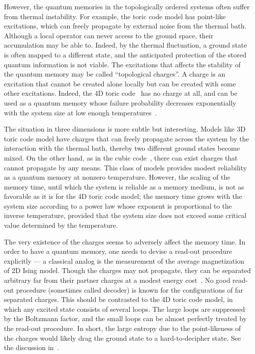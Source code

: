 \documentclass[letterpaper,12pt]{amsart}
\theoremstyle{definition} \newtheorem{defn}{Definition}
\theoremstyle{definition} \newtheorem{rem}{Remark}
\theoremstyle{definition} \newtheorem{example}{Example}
\begin{document}
However, the quantum memories in the topologically ordered systems
often suffer from thermal instability.
For example, the toric code model has point-like excitations,
which can freely propagate by external noise from the thermal bath.
Although a local operator can never access to the ground space,
their accumulation may be able to.
Indeed, by the thermal fluctuation, a ground state
is often mapped to a different state,
and the anticipated protection of the stored quantum information is not viable.
The excitations that affects the stability of the quantum memory
may be called ``topological charges''.
A charge is an excitation that cannot be created alone locally
but can be created with some other excitations.
Indeed, the 4D toric code~\cite{DennisKitaevLandahlEtAl2002Topological}
has no charge at all,
and can be used as a quantum memory whose failure probability
decreases exponentially with the system size at low enough 
temperatures~\cite{AlickiHorodeckiHorodeckiEtAl2010thermal,
ChesiLossBravyiEtAl2010Thermodynamic}.


The situation in three dimensions is more subtle but interesting.
Models like 3D toric code model have charges
that can freely propagate across the system by the interaction with the thermal bath,
thereby two different ground states become mixed.
On the other hand, as in the cubic code~\cite{Haah2011Local,BravyiHaah2011Energy,BravyiHaah2011Memory},
there can exist charges that cannot propagate by any means.
This class of models provides modest reliability as a quantum memory at nonzero temperature.
However, the scaling of the memory time, until which the system is reliable as a memory medium,
is not as favorable as it is for the 4D toric code model;
the memory time grows with the system size according to a power law
whose exponent is proportional to the inverse temperature,
provided that the system size does not exceed some critical value
determined by the temperature.


The very existence of the charges seems to adversely affect the memory time.
In order to have a quantum memory,
one needs to devise a read-out procedure explicitly ---
a classical analog is the measurement of the average magnetization of 2D Ising model.
Though the charges may not propagate,
they can be separated arbitrary far from their partner charges
at a modest energy cost~\cite{BravyiHaah2011Energy}.
No good read-out procedure (sometimes called decoder)
is known for the configurations of far separated charges.
This should be contrasted to the 4D toric code model,
in which any excited state consists of several loops.
The large loops are suppressed by the Boltzmann factor,
and the small loops can be almost perfectly treated by the read-out procedure.
In short, the large entropy due to the point-likeness of the charges
would likely drag the ground state to a hard-to-decipher state.
See the discussion in~\cite{BravyiHaah2011Memory}.
\end{document}
